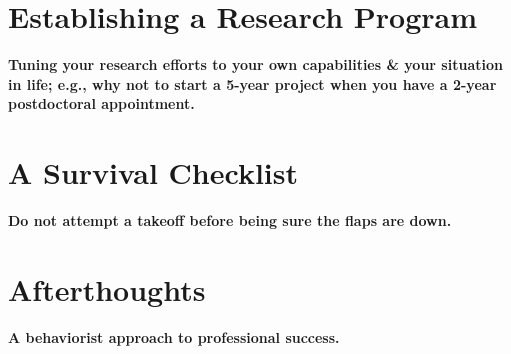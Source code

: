 \documentclass{article}
\numberwithin{equation}{section}
\begin{document}

\section{Establishing a Research Program}

\begin{center}
	\textsf{\textbf{Tuning your research efforts to your own capabilities \& your situation in life; e.g., why not to start a 5-year project when you have a 2-year postdoctoral appointment.}}
\end{center}


\section{A Survival Checklist}

\begin{center}
	\textsf{\textbf{Do not attempt a takeoff before being sure the flaps are down.}}
\end{center}


\section{Afterthoughts}

\begin{center}
	\textsf{\textbf{A behaviorist approach to professional success.}}
\end{center}


\printbibliography[heading=bibintoc]
	
\end{document}
